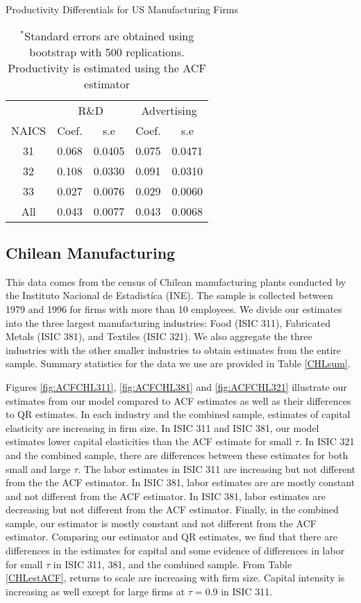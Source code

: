 \documentclass[11pt]{article}
\begin{document}
\begin{table}[H]
\centering
\caption{Productivity Differentials for US Manufacturing Firms}
\begin{tabular}{ccccc}
  \hline\hline & \multicolumn{2}{c}{R\&D}  & \multicolumn{2}{c}{Advertising} \\ \cmidrule(lr){2-3} \cmidrule(lr){4-5}NAICS & Coef. & s.e & Coef. & s.e \\ 
  \hline
31 & 0.068 & 0.0405 & 0.075 & 0.0471 \\ 
  32 & 0.108 & 0.0330 & 0.091 & 0.0310 \\ 
  33 & 0.027 & 0.0076 & 0.029 & 0.0060 \\ 
  All & 0.043 & 0.0077 & 0.043 & 0.0068 \\ 
   \hline
\end{tabular}
\caption*{\footnotesize $^{*}$Standard errors are obtained using bootstrap with 500 replications. Productivity is estimated using the ACF estimator}
\end{table}

\subsection{Chilean Manufacturing}
This data comes from the census of Chilean manufacturing plants conducted by the Instituto Nacional de Estadist\'ica (INE). The sample is collected between 1979 and 1996 for firms with more than 10 employees. We divide our estimates into the three largest manufacturing industries: Food (ISIC 311), Fabricated Metals (ISIC 381), and Textiles (ISIC 321). We also aggregate the three industries with the other smaller industries to obtain estimates from the entire sample. Summary statistics for the data we use are provided in Table \ref{CHLsum}.

Figures \ref{fig:ACFCHL311}, \ref{fig:ACFCHL381} and \ref{fig:ACFCHL321} illustrate our estimates from our model compared to ACF estimates as well as their differences to QR estimates. In each industry and the combined sample, estimates of capital elasticity are increasing in firm size. In ISIC 311 and ISIC 381, our model estimates lower capital elasticities than the ACF estimate for small $\tau$. In ISIC 321 and the combined sample, there are differences between these estimates for both small and large $\tau$. The labor estimates in ISIC 311 are increasing but not different from the the ACF estimator. In ISIC 381, labor estimates are are mostly constant and not different from the ACF estimator. In ISIC 381, labor estimates are decreasing but not different from the ACF estimator. Finally, in the combined sample, our estimator is mostly constant and not different from the ACF estimator. Comparing our estimator and QR estimates, we find that there are differences in the estimates for capital and some evidence of differences in labor for small $\tau$ in ISIC 311, 381, and the combined sample. From Table \ref{CHLestACF}, returns to scale are increasing with firm size. Capital intensity is increasing as well except for large firms at $\tau=0.9$ in ISIC 311.
\end{document}

